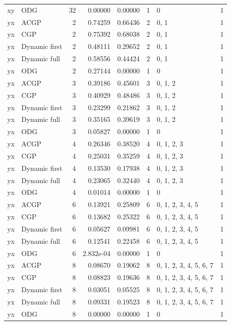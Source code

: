 \documentclass[10pt,a4paper]{article}
\begin{document}
\begin{longtable}{@{}p{23mm}p{29mm}rrrrp{36mm}r@{}}
xy & ODG & 32 & 0.00000 & 0.00000 & 1 & 0 & 1 \\
yx & ACGP & 2 & 0.74259 & 0.66436 & 2 & 0, 1 & 1 \\
yx & CGP & 2 & 0.75392 & 0.68038 & 2 & 0, 1 & 1 \\
yx & Dynamic first & 2 & 0.48111 & 0.29652 & 2 & 0, 1 & 1 \\
yx & Dynamic full & 2 & 0.58556 & 0.44424 & 2 & 0, 1 & 1 \\
yx & ODG & 2 & 0.27144 & 0.00000 & 1 & 0 & 1 \\
yx & ACGP & 3 & 0.39186 & 0.45601 & 3 & 0, 1, 2 & 1 \\
yx & CGP & 3 & 0.40929 & 0.48486 & 3 & 0, 1, 2 & 1 \\
yx & Dynamic first & 3 & 0.23299 & 0.21862 & 3 & 0, 1, 2 & 1 \\
yx & Dynamic full & 3 & 0.35165 & 0.39619 & 3 & 0, 1, 2 & 1 \\
yx & ODG & 3 & 0.05827 & 0.00000 & 1 & 0 & 1 \\
yx & ACGP & 4 & 0.26346 & 0.38520 & 4 & 0, 1, 2, 3 & 1 \\
yx & CGP & 4 & 0.25031 & 0.35259 & 4 & 0, 1, 2, 3 & 1 \\
yx & Dynamic first & 4 & 0.13530 & 0.17938 & 4 & 0, 1, 2, 3 & 1 \\
yx & Dynamic full & 4 & 0.23065 & 0.32440 & 4 & 0, 1, 2, 3 & 1 \\
yx & ODG & 4 & 0.01014 & 0.00000 & 1 & 0 & 1 \\
yx & ACGP & 6 & 0.13921 & 0.25809 & 6 & 0, 1, 2, 3, 4, 5 & 1 \\
yx & CGP & 6 & 0.13682 & 0.25322 & 6 & 0, 1, 2, 3, 4, 5 & 1 \\
yx & Dynamic first & 6 & 0.05627 & 0.09981 & 6 & 0, 1, 2, 3, 4, 5 & 1 \\
yx & Dynamic full & 6 & 0.12541 & 0.22458 & 6 & 0, 1, 2, 3, 4, 5 & 1 \\
yx & ODG & 6 & 2.832e-04 & 0.00000 & 1 & 0 & 1 \\
yx & ACGP & 8 & 0.08670 & 0.19062 & 8 & 0, 1, 2, 3, 4, 5, 6, 7 & 1 \\
yx & CGP & 8 & 0.08823 & 0.19636 & 8 & 0, 1, 2, 3, 4, 5, 6, 7 & 1 \\
yx & Dynamic first & 8 & 0.03051 & 0.05525 & 8 & 0, 1, 2, 3, 4, 5, 6, 7 & 1 \\
yx & Dynamic full & 8 & 0.09331 & 0.19523 & 8 & 0, 1, 2, 3, 4, 5, 6, 7 & 1 \\
yx & ODG & 8 & 0.00000 & 0.00000 & 1 & 0 & 1 \\

\end{longtable}
\end{document}
